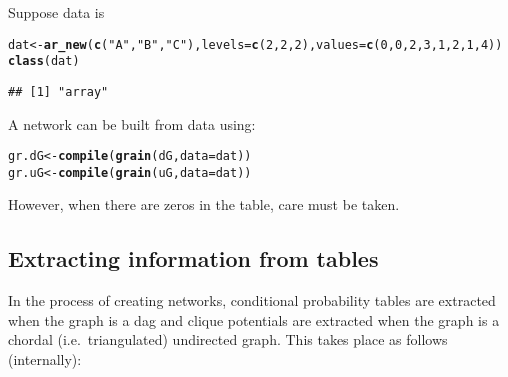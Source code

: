 \documentclass[10pt]{article}\usepackage[]{graphicx}\usepackage[]{color}
\makeatletter
\newcommand{\hlnum}[1]{\textcolor[rgb]{0.686,0.059,0.569}{#1}}%
\newcommand{\hlstr}[1]{\textcolor[rgb]{0.192,0.494,0.8}{#1}}%
\newcommand{\hlstd}[1]{\textcolor[rgb]{0.345,0.345,0.345}{#1}}%
\newcommand{\hlkwb}[1]{\textcolor[rgb]{0.69,0.353,0.396}{#1}}%
\newcommand{\hlkwc}[1]{\textcolor[rgb]{0.333,0.667,0.333}{#1}}%
\newcommand{\hlkwd}[1]{\textcolor[rgb]{0.737,0.353,0.396}{\textbf{#1}}}%
\newenvironment{kframe}{%
 \def\at@end@of@kframe{}%
 \ifinner\ifhmode%
  \def\at@end@of@kframe{\end{minipage}}%
  \begin{minipage}{\columnwidth}%
 \fi\fi%
 \def\FrameCommand##1{\hskip\@totalleftmargin \hskip-\fboxsep
 \colorbox{shadecolor}{##1}\hskip-\fboxsep
     \hskip-\linewidth \hskip-\@totalleftmargin \hskip\columnwidth}%
 \MakeFramed {\advance\hsize-\width
   \@totalleftmargin\z@ \linewidth\hsize
   \@setminipage}}%
 {\par\unskip\endMakeFramed%
 \at@end@of@kframe}
\newenvironment{knitrout}{}{} %
\makeatother
\begin{document}
Suppose data is
\begin{knitrout}
\color{fgcolor}\begin{kframe}
\begin{alltt}
\hlstd{dat} \hlkwb{<-} \hlkwd{ar_new}\hlstd{(}\hlkwd{c}\hlstd{(}\hlstr{"A"}\hlstd{,} \hlstr{"B"}\hlstd{,} \hlstr{"C"}\hlstd{),} \hlkwc{levels}\hlstd{=}\hlkwd{c}\hlstd{(}\hlnum{2}\hlstd{,} \hlnum{2}\hlstd{,} \hlnum{2}\hlstd{),} \hlkwc{values}\hlstd{=}\hlkwd{c}\hlstd{(}\hlnum{0}\hlstd{,} \hlnum{0}\hlstd{,} \hlnum{2}\hlstd{,} \hlnum{3}\hlstd{,} \hlnum{1}\hlstd{,} \hlnum{2}\hlstd{,} \hlnum{1}\hlstd{,} \hlnum{4}\hlstd{))}
\hlkwd{class}\hlstd{(dat)}
\end{alltt}
\begin{verbatim}
## [1] "array"
\end{verbatim}
\end{kframe}
\end{knitrout}

A network can be built from data using:

\begin{knitrout}
\color{fgcolor}\begin{kframe}
\begin{alltt}
\hlstd{gr.dG} \hlkwb{<-} \hlkwd{compile}\hlstd{(} \hlkwd{grain}\hlstd{( dG,} \hlkwc{data}\hlstd{=dat ) )}
\hlstd{gr.uG} \hlkwb{<-} \hlkwd{compile}\hlstd{(} \hlkwd{grain}\hlstd{( uG,} \hlkwc{data}\hlstd{=dat ) )}
\end{alltt}
\end{kframe}
\end{knitrout}

However, when there are zeros in the table, care must be taken.

\subsection{Extracting information from tables}
\label{sec:extr-inform-from}

In the process of creating networks, conditional probability tables
are extracted when the graph is a dag and clique potentials are
extracted when the graph is a chordal (i.e.\ triangulated) undirected
graph. This takes place as follows (internally):
\end{document}
